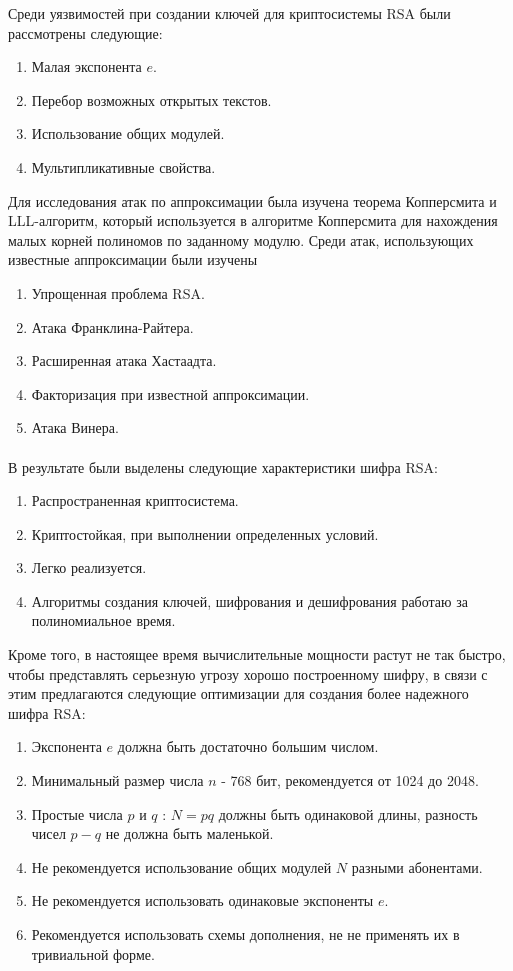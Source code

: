 	Среди уязвимостей при создании ключей для криптосистемы RSA были рассмотрены следующие:
		\begin{enumerate}
			\item Малая экспонента $e$.
			\item Перебор возможных открытых текстов.
			\item Использование общих модулей.
			\item Мультипликативные свойства.
		\end{enumerate}

	Для исследования атак по аппроксимации была изучена теорема Копперсмита и LLL-алгоритм, который используется в алгоритме Копперсмита для нахождения малых корней полиномов по заданному модулю. Среди атак, использующих известные аппроксимации были изучены
		\begin{enumerate}
			\item Упрощенная проблема RSA.
			\item Атака Франклина-Райтера.
			\item Расширенная атака Хастаадта.
			\item Факторизация при известной аппроксимации.
			\item Атака Винера.
		\end{enumerate}

	\paragraph{} В результате были выделены следующие характеристики шифра RSA:

		\begin{enumerate}
			\item Распространенная криптосистема.
			\item Криптостойкая, при выполнении определенных условий.
			\item Легко реализуется.
			\item Алгоритмы создания ключей, шифрования и дешифрования работаю за полиномиальное время.
		\end{enumerate}	

	Кроме того, в настоящее время вычислительные мощности растут не так быстро, чтобы представлять серьезную угрозу хорошо построенному шифру, в связи с этим предлагаются следующие оптимизации для создания более надежного шифра RSA:
	
		\begin{enumerate}
			\item Экспонента $e$ должна быть достаточно большим числом.
			\item Минимальный размер числа $n$ - 768 бит, рекомендуется от 1024 до 2048.
			\item Простые числа $p$ и $q$ : $N=pq$ должны быть одинаковой длины, разность чисел $p - q$ не должна быть маленькой.
			\item Не рекомендуется использование общих модулей $N$ разными абонентами.
			\item Не рекомендуется использовать одинаковые экспоненты $e$.
			\item Рекомендуется использовать схемы дополнения, не не применять их в тривиальной форме.
		\end{enumerate}

